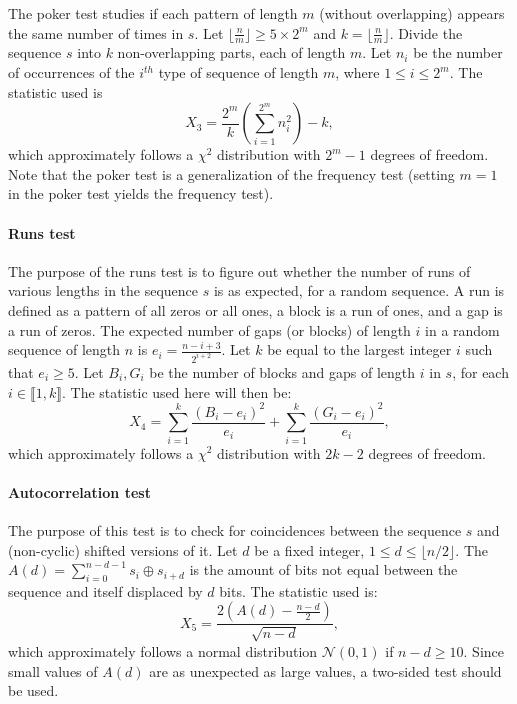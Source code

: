 The poker test studies if each pattern of length $m$ (without overlapping) appears the same number of times in $s$. Let $\lfloor \frac{n}{m} \rfloor\geqslant 5 \times 2^m$ and $k= \lfloor \frac{n}{m} \rfloor $. Divide the sequence $s$ into $k$ non-overlapping parts, each of length $m$. Let $n_i$ be the number of occurrences of the $i^{th}$ type of sequence of length $m$, where $1 \leqslant i \leqslant 2^m$. The statistic used is 
\begin{equation*}
X_3=\dfrac{2^m}{k}\left(\displaystyle{\sum^{2^m}_{i=1}n^2_i}\right)-k,
\end{equation*}
which approximately follows a $\chi^2$ distribution with $2^m-1$ degrees of freedom. Note that the poker test is a generalization of the frequency test (setting $m = 1$ in the poker test yields the frequency test).

\paragraph{Runs test}

The purpose of the runs test is to figure out whether the number of runs of various lengths in the sequence $s$ is as expected, for a random sequence. A run is defined as a pattern of all zeros or all ones, a block is a run of ones, and a gap is a run of zeros. The expected number of gaps (or blocks) of length $i$ in a random sequence of length $n$ is $e_i = \frac{n-i+3}{2^{i+2}}$. Let $k$ be equal to the largest integer $i$ such that $e_i \geqslant 5$. Let
$B_i , G_i$ be the number of blocks and gaps of length $i$ in $s$, for each $i \in \llbracket 1, k\rrbracket$. The statistic used here will then be:
\begin{equation*}
\displaystyle{X_4=\sum^k_{i=1}\frac{(B_i-e_i)^2}{e_i}+\sum^k_{i=1}\frac{(G_i-e_i)^2}{e_i}},
\end{equation*}
\noindent which approximately follows a $\chi^2$ distribution with $2k - 2$ degrees of freedom.

\paragraph{Autocorrelation test}

The purpose of this test is to check for coincidences between the sequence $s$ and (non-cyclic) shifted versions of it. Let $d$ be a fixed integer, $ 1 \leqslant d \leqslant \lfloor n/2 \rfloor$. The  $A(d) = \sum_{i=0}^{n-d-1} s_i\oplus s_{i+d}$ is the amount of bits not equal between the sequence and itself displaced by $d$ bits. The statistic used is:
\begin{equation*}
X_5=\dfrac{2 \left(A(d)-\frac{n-d}{2}\right)}{\sqrt{n-d}},
\end{equation*}
which approximately follows a normal distribution $\mathcal{N}(0, 1)$ if $n-d \geqslant 10$. Since small values of $A(d)$ are as unexpected as large values, a two-sided test should be used.

